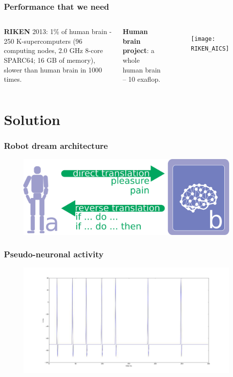 \documentclass[12pt, aspectratio=169]{beamer}
\begin{document}

\begin{frame}
\frametitle{Performance that we need}
\begin{columns}[c] %

\textbf{RIKEN} 2013: 1\% of human brain - 250 K-supercomputers
(96 computing nodes, 2.0 GHz 8-core SPARC64; 16 GB of memory), slower than human brain in 1000 times. 

\textbf{Human brain project}: a whole human brain -- 10 exaflop.


\begin{figure}
\texttt{[image: RIKEN\_AICS]}
\end{figure}
\end{columns}
\end{frame}


\section{Solution}

\begin{frame}
\frametitle{Robot dream architecture}
\begin{figure}
\includegraphics[width=0.8\linewidth]{robot-dream_translations}
\end{figure}
\end{frame}


\begin{frame}
\frametitle{Pseudo-neuronal activity}
\begin{figure}
\includegraphics[width=0.8\linewidth]{pseudo-neuronal-activity}
\end{figure}
\end{frame}
\end{document}
